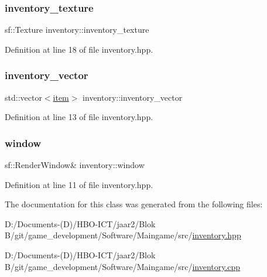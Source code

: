 \subsubsection{\texorpdfstring{inventory\+\_\+texture}{inventory\_texture}}
{\footnotesize\ttfamily sf\+::\+Texture inventory\+::inventory\+\_\+texture\hspace{0.3cm}{\ttfamily [private]}}



Definition at line 18 of file inventory.\+hpp.

\mbox{\label{classinventory_ac9ae72d119fe30ef46df9b8c05faed61}} 
\subsubsection{\texorpdfstring{inventory\+\_\+vector}{inventory\_vector}}
{\footnotesize\ttfamily std\+::vector$<$\hyperlink{classitem}{item}$>$ inventory\+::inventory\+\_\+vector\hspace{0.3cm}{\ttfamily [private]}}



Definition at line 13 of file inventory.\+hpp.

\mbox{\label{classinventory_a699933dd5f2c8a98088ec92cbf2d5bcc}} 
\subsubsection{\texorpdfstring{window}{window}}
{\footnotesize\ttfamily sf\+::\+Render\+Window\& inventory\+::window\hspace{0.3cm}{\ttfamily [private]}}



Definition at line 11 of file inventory.\+hpp.



The documentation for this class was generated from the following files\+:\begin{DoxyCompactItemize}
\item 
D\+:/\+Documents-\/(\+D)/\+H\+B\+O-\/\+I\+C\+T/jaar2/\+Blok B/git/game\+\_\+development/\+Software/\+Maingame/src/\hyperlink{inventory_8hpp}{inventory.\+hpp}\item 
D\+:/\+Documents-\/(\+D)/\+H\+B\+O-\/\+I\+C\+T/jaar2/\+Blok B/git/game\+\_\+development/\+Software/\+Maingame/src/\hyperlink{inventory_8cpp}{inventory.\+cpp}\end{DoxyCompactItemize}
